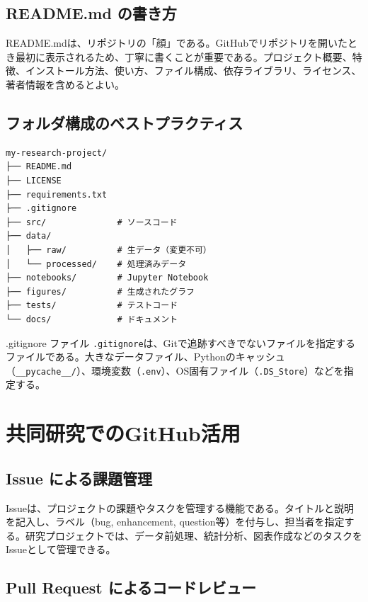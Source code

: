 \subsection{README.md の書き方}

README.mdは、リポジトリの「顔」である。GitHubでリポジトリを開いたとき最初に表示されるため、丁寧に書くことが重要である。プロジェクト概要、特徴、インストール方法、使い方、ファイル構成、依存ライブラリ、ライセンス、著者情報を含めるとよい。

\subsection{フォルダ構成のベストプラクティス}

\begin{verbatim}
my-research-project/
├── README.md
├── LICENSE
├── requirements.txt
├── .gitignore
├── src/              # ソースコード
├── data/
│   ├── raw/          # 生データ（変更不可）
│   └── processed/    # 処理済みデータ
├── notebooks/        # Jupyter Notebook
├── figures/          # 生成されたグラフ
├── tests/            # テストコード
└── docs/             # ドキュメント
\end{verbatim}

\begin{itembox}[l]{.gitignore ファイル}
\texttt{.gitignore}は、Gitで追跡すべきでないファイルを指定するファイルである。大きなデータファイル、Pythonのキャッシュ（\texttt{\_\_pycache\_\_/}）、環境変数（\texttt{.env}）、OS固有ファイル（\texttt{.DS\_Store}）などを指定する。
\end{itembox}

\section{共同研究でのGitHub活用}

\subsection{Issue による課題管理}

Issueは、プロジェクトの課題やタスクを管理する機能である。タイトルと説明を記入し、ラベル（bug, enhancement, question等）を付与し、担当者を指定する。研究プロジェクトでは、データ前処理、統計分析、図表作成などのタスクをIssueとして管理できる。

\subsection{Pull Request によるコードレビュー}

